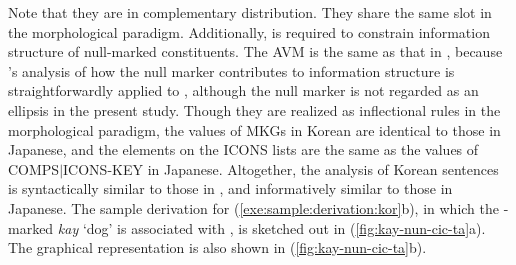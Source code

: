 \noindent Note that they are in complementary distribution. They share
the same slot in the morphological paradigm.  Additionally,
 is required to constrain information structure of
null-marked constituents. The AVM is the same as that in
, because \citet{yatabe:99}'s analysis of how the null
marker contributes to information structure is straightforwardly
applied to , although the null marker is not regarded as
an ellipsis in the present study.  Though they are realized as
inflectional rules in the morphological paradigm, the values of MKGs
in Korean are identical to those in Japanese, and the elements
on the ICONS lists are the same as the values of
COMPS{$\mid$}ICONS-KEY in Japanese. Altogether, the
analysis of Korean sentences is syntactically similar to those in
, and informatively similar to those in Japanese. The sample
derivation for (\ref{exe:sample:derivation:kor}b), in which the
\nun-marked \textit{kay} `dog' is associated with
, is sketched out in
(\ref{fig:kay-nun-cic-ta}a). The graphical representation is also
shown in (\ref{fig:kay-nun-cic-ta}b).





